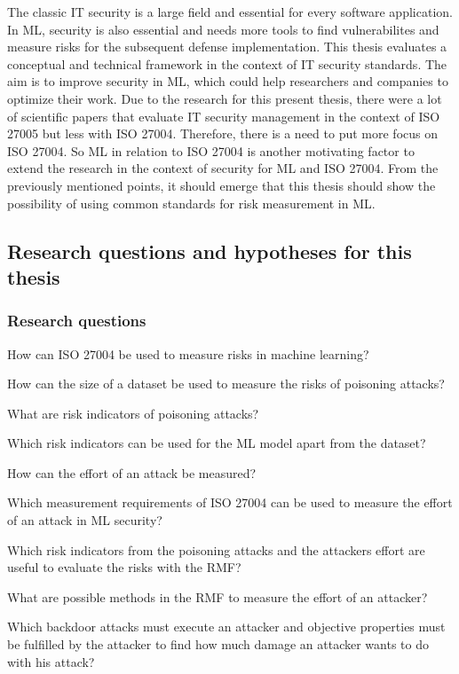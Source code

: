 The classic IT security is a large field and essential for every software application. In ML, security is also essential and needs more tools to find vulnerabilites and measure risks for
the subsequent defense implementation. This thesis evaluates a conceptual and technical framework in the context of IT security standards. The aim is to improve security in ML, which could
help researchers and companies to optimize their work. Due to the research for this present thesis, there were a lot of scientific papers that evaluate IT security management in the
context of ISO 27005 but less with ISO 27004. Therefore, there is a need to put more focus on ISO 27004. So ML in relation to ISO 27004 is another motivating factor to extend the research
in the context of security for ML and ISO 27004. From the previously mentioned points, it should emerge that this thesis should show the possibility of using common standards for risk
measurement in ML.

\subsection{Research questions and hypotheses for this thesis}


\subsubsection*{Research questions}

\begin{questions}
  \item How can ISO 27004 be used to measure risks in machine learning? \label{itm:rq1}
  \item How can the size of a dataset be used to measure the risks of poisoning attacks? \label{itm:rq2}
  \item What are risk indicators of poisoning attacks? \label{itm:rq3}
  \item Which risk indicators can be used for the ML model apart from the dataset? \label{itm:rq4}
  \item How can the effort of an attack be measured? \label{itm:rq5}
  \item Which measurement requirements of ISO 27004 can be used to measure the effort of an attack in ML security? \label{itm:rq6}
  \item Which risk indicators from the poisoning attacks and the attackers effort are useful to evaluate the risks with the RMF? \label{itm:rq7}
  \item What are possible methods in the RMF to measure the effort of an attacker? \label{itm:rq8}
  \item Which backdoor attacks must execute an attacker and objective properties must be fulfilled by the attacker to find how much damage an attacker wants to do with his attack?
  \label{itm:rq9}
\end{questions}

